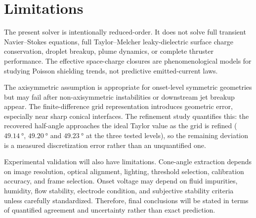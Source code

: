\section{Limitations}

The present solver is intentionally reduced-order. It does not solve full transient Navier--Stokes equations, full Taylor--Melcher leaky-dielectric surface charge conservation, droplet breakup, plume dynamics, or complete thruster performance. The effective space-charge closures are phenomenological models for studying Poisson shielding trends, not predictive emitted-current laws.

The axisymmetric assumption is appropriate for onset-level symmetric geometries but may fail after non-axisymmetric instabilities or downstream jet breakup appear. The finite-difference grid representation introduces geometric error, especially near sharp conical interfaces. The refinement study quantifies this: the recovered half-angle approaches the ideal Taylor value as the grid is refined ($\SI{49.14}{\degree}$, $\SI{49.20}{\degree}$ and $\SI{49.23}{\degree}$ at the three tested levels), so the remaining deviation is a measured discretization error rather than an unquantified one.

Experimental validation will also have limitations. Cone-angle extraction depends on image resolution, optical alignment, lighting, threshold selection, calibration accuracy, and frame selection. Onset voltage may depend on fluid impurities, humidity, flow stability, electrode condition, and subjective stability criteria unless carefully standardized. Therefore, final conclusions will be stated in terms of quantified agreement and uncertainty rather than exact prediction.
